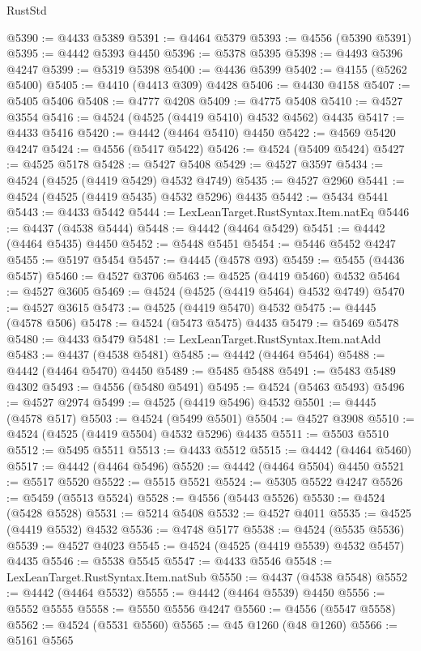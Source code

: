 \begin{lexlean}{RustStd}
\begin{coremodule}
@5390 := @4433 @5389
@5391 := @4464 @5379
@5393 := @4556 (@5390 @5391)
@5395 := @4442 @5393 @4450
@5396 := @5378 @5395
@5398 := @4493 @5396 @4247
@5399 := @5319 @5398
@5400 := @4436 @5399
@5402 := @4155 (@5262 @5400)
@5405 := @4410 (@4413 @309) @4428
@5406 := @4430 @4158
@5407 := @5405 @5406
@5408 := @4777 @4208
@5409 := @4775 @5408
@5410 := @4527 @3554
@5416 := @4524 (@4525 (@4419 @5410) @4532 @4562) @4435
@5417 := @4433 @5416
@5420 := @4442 (@4464 @5410) @4450
@5422 := @4569 @5420 @4247
@5424 := @4556 (@5417 @5422)
@5426 := @4524 (@5409 @5424)
@5427 := @4525 @5178
@5428 := @5427 @5408
@5429 := @4527 @3597
@5434 := @4524 (@4525 (@4419 @5429) @4532 @4749)
@5435 := @4527 @2960
@5441 := @4524 (@4525 (@4419 @5435) @4532 @5296) @4435
@5442 := @5434 @5441
@5443 := @4433 @5442
@5444 := LexLeanTarget.RustSyntax.Item.natEq
@5446 := @4437 (@4538 @5444)
@5448 := @4442 (@4464 @5429)
@5451 := @4442 (@4464 @5435) @4450
@5452 := @5448 @5451
@5454 := @5446 @5452 @4247
@5455 := @5197 @5454
@5457 := @4445 (@4578 @93)
@5459 := @5455 (@4436 @5457)
@5460 := @4527 @3706
@5463 := @4525 (@4419 @5460) @4532
@5464 := @4527 @3605
@5469 := @4524 (@4525 (@4419 @5464) @4532 @4749)
@5470 := @4527 @3615
@5473 := @4525 (@4419 @5470) @4532
@5475 := @4445 (@4578 @506)
@5478 := @4524 (@5473 @5475) @4435
@5479 := @5469 @5478
@5480 := @4433 @5479
@5481 := LexLeanTarget.RustSyntax.Item.natAdd
@5483 := @4437 (@4538 @5481)
@5485 := @4442 (@4464 @5464)
@5488 := @4442 (@4464 @5470) @4450
@5489 := @5485 @5488
@5491 := @5483 @5489 @4302
@5493 := @4556 (@5480 @5491)
@5495 := @4524 (@5463 @5493)
@5496 := @4527 @2974
@5499 := @4525 (@4419 @5496) @4532
@5501 := @4445 (@4578 @517)
@5503 := @4524 (@5499 @5501)
@5504 := @4527 @3908
@5510 := @4524 (@4525 (@4419 @5504) @4532 @5296) @4435
@5511 := @5503 @5510
@5512 := @5495 @5511
@5513 := @4433 @5512
@5515 := @4442 (@4464 @5460)
@5517 := @4442 (@4464 @5496)
@5520 := @4442 (@4464 @5504) @4450
@5521 := @5517 @5520
@5522 := @5515 @5521
@5524 := @5305 @5522 @4247
@5526 := @5459 (@5513 @5524)
@5528 := @4556 (@5443 @5526)
@5530 := @4524 (@5428 @5528)
@5531 := @5214 @5408
@5532 := @4527 @4011
@5535 := @4525 (@4419 @5532) @4532
@5536 := @4748 @5177
@5538 := @4524 (@5535 @5536)
@5539 := @4527 @4023
@5545 := @4524 (@4525 (@4419 @5539) @4532 @5457) @4435
@5546 := @5538 @5545
@5547 := @4433 @5546
@5548 := LexLeanTarget.RustSyntax.Item.natSub
@5550 := @4437 (@4538 @5548)
@5552 := @4442 (@4464 @5532)
@5555 := @4442 (@4464 @5539) @4450
@5556 := @5552 @5555
@5558 := @5550 @5556 @4247
@5560 := @4556 (@5547 @5558)
@5562 := @4524 (@5531 @5560)
@5565 := @45 @1260 (@48 @1260)
@5566 := @5161 @5565

\end{coremodule}
\end{lexlean}
